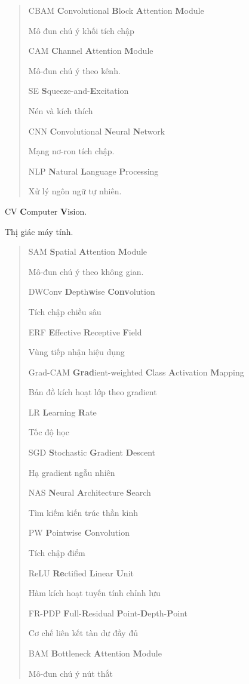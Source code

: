 \documentclass[
  12pt,
  a4paper,
]{report}
\begin{document}
\begin{quote}
CBAM \textbf{C}onvolutional \textbf{B}lock \textbf{A}ttention
\textbf{M}odule

Mô đun chú ý khối tích chập

CAM \textbf{C}hannel \textbf{A}ttention \textbf{M}odule

Mô-đun chú ý theo kênh.

SE \textbf{S}queeze-and-\textbf{E}xcitation

Nén và kích thích

CNN \textbf{C}onvolutional \textbf{N}eural \textbf{N}etwork

Mạng nơ-ron tích chập.

NLP \textbf{N}atural \textbf{L}anguage \textbf{P}rocessing

Xử lý ngôn ngữ tự nhiên.
\end{quote}

CV \textbf{C}omputer \textbf{V}ision.

Thị giác máy tính.

\begin{quote}
SAM \textbf{S}patial \textbf{A}ttention \textbf{M}odule

Mô-đun chú ý theo không gian.

DWConv \textbf{D}epth\textbf{w}ise \textbf{Conv}olution

Tích chập chiều sâu

ERF \textbf{E}ffective \textbf{R}eceptive \textbf{F}ield

Vùng tiếp nhận hiệu dụng

Grad-CAM \textbf{Grad}ient-weighted \textbf{C}lass \textbf{A}ctivation
\textbf{M}apping

Bản đồ kích hoạt lớp theo gradient

LR \textbf{L}earning \textbf{R}ate

Tốc độ học

SGD \textbf{S}tochastic \textbf{G}radient \textbf{D}escent

Hạ gradient ngẫu nhiên

NAS \textbf{N}eural \textbf{A}rchitecture \textbf{S}earch

Tìm kiếm kiến trúc thần kinh

PW \textbf{P}ointwise \textbf{C}onvolution

Tích chập điểm

ReLU \textbf{Re}ctified \textbf{L}inear \textbf{U}nit

Hàm kích hoạt tuyến tính chỉnh lưu

FR-PDP \textbf{F}ull-\textbf{R}esidual
\textbf{P}oint-\textbf{D}epth-\textbf{P}oint

Cơ chế liên kết tàn dư đầy đủ

BAM \textbf{B}ottleneck \textbf{A}ttention \textbf{M}odule

Mô-đun chú ý nút thắt
\end{quote}
\end{document}
